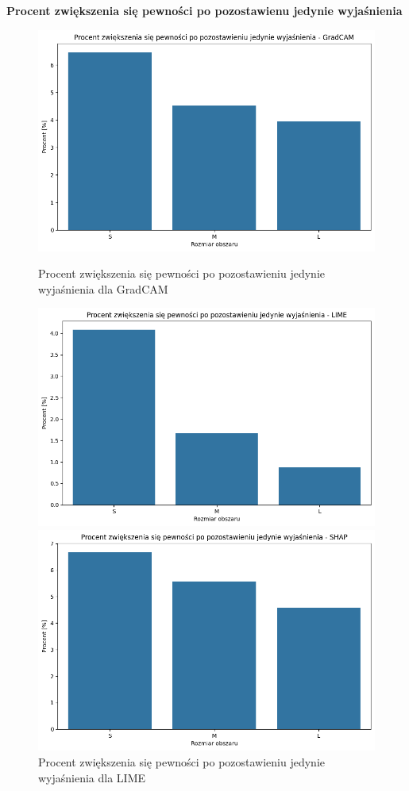\textbf{Procent zwiększenia się pewności po pozostawienu jedynie wyjaśnienia}
\begin{figure}
	\centering
	\begin{minipage}[b]{0.3\textwidth}
		\centering\includegraphics[width=.9\textwidth]{img/size_confidence_womask_percent_gradcam}
		\caption{Procent zwiększenia się pewności po pozostawieniu jedynie wyjaśnienia dla GradCAM}  \label{rys:size_confidence_womask_percent_gradcam}
	\end{minipage}
	\begin{minipage}[b]{0.3\textwidth}
		\centering\includegraphics[width=.9\textwidth]{img/size_confidence_womask_percent_lime}
		\caption{Procent zwiększenia się pewności po pozostawieniu jedynie wyjaśnienia dla LIME}  \label{rys:size_confidence_womask_percent_lime}
	\end{minipage}
	\begin{minipage}[b]{0.3\textwidth}
		\centering\includegraphics[width=.9\textwidth]{img/size_confidence_womask_percent_shap}

\end{minipage}
\end{figure}
